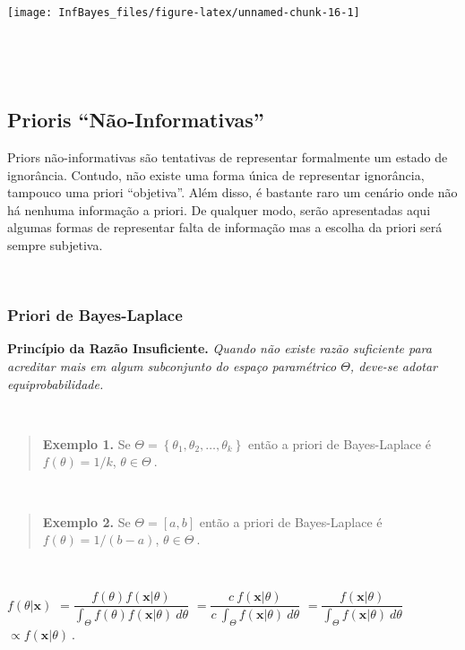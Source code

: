\documentclass[
]{book}
\begin{document}
\begin{center}\texttt{[image: InfBayes\_files/figure-latex/unnamed-chunk-16-1]} \end{center}

\(~\)

\(~\)

\hypertarget{prioris-nuxe3o-informativas}{%
\subsection{Prioris ``Não-Informativas''}\label{prioris-nuxe3o-informativas}}

Priors não-informativas são tentativas de representar formalmente um estado de ignorância. Contudo, não existe uma forma única de representar ignorância, tampouco uma priori ``objetiva''. Além disso, é bastante raro um cenário onde não há nenhuma informação a priori. De qualquer modo, serão apresentadas aqui algumas formas de representar falta de informação mas a escolha da priori será sempre subjetiva.

\(~\)

\hypertarget{priori-de-bayes-laplace}{%
\subsubsection{Priori de Bayes-Laplace}\label{priori-de-bayes-laplace}}

\textbf{Princípio da Razão Insuficiente.} \emph{Quando não existe razão suficiente para acreditar mais em algum subconjunto do espaço paramétrico \(\Theta\), deve-se adotar equiprobabilidade.}

\(~\)

\begin{quote}
\textbf{Exemplo 1.} Se \(\Theta=\left\{\theta_1,\theta_2,\ldots,\theta_k\right\}\) então a priori de Bayes-Laplace é \(f(\theta)=1/k\), \(\theta \in \Theta~.\)
\end{quote}

\(~\)

\begin{quote}
\textbf{Exemplo 2.} Se \(\Theta=\left[a,b\right]\) então a priori de Bayes-Laplace é \(f(\theta)=1/(b-a)\), \(\theta \in \Theta~.\)
\end{quote}

\(~\)

\(f(\theta|\boldsymbol{x})\)
\(= \dfrac{f(\theta)f(\boldsymbol{x}|\theta)}{\int_\Theta f(\theta)f(\boldsymbol{x}|\theta)~d\theta}\)
\(= \dfrac{c~f(\boldsymbol{x}|\theta)}{c~\int_\Theta f(\boldsymbol{x}|\theta)~d\theta}\)
\(= \dfrac{f(\boldsymbol{x}|\theta)}{\int_\Theta f(\boldsymbol{x}|\theta)~d\theta}\)
\(\propto f(\boldsymbol{x}|\theta)~.\)
\end{document}
